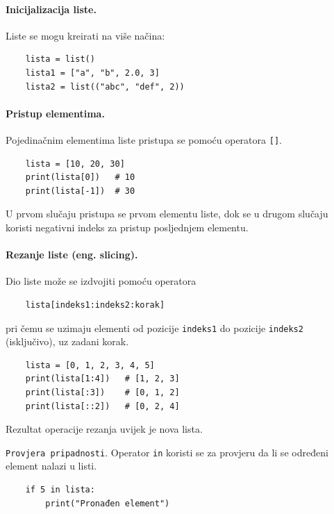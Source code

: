 \paragraph{Inicijalizacija liste.}  Liste se mogu kreirati na više načina: 

\begin{verbatim}
	lista = list()
	lista1 = ["a", "b", 2.0, 3]	
	lista2 = list(("abc", "def", 2))
\end{verbatim}

\paragraph{Pristup elementima.}  Pojedinačnim elementima liste pristupa se pomoću operatora \texttt{[]}.

\begin{verbatim}
	lista = [10, 20, 30]
	print(lista[0])   # 10
	print(lista[-1])  # 30
\end{verbatim}

U prvom slučaju pristupa se prvom elementu liste, dok se u drugom slučaju koristi negativni indeks za pristup posljednjem elementu.

\paragraph{Rezanje liste (eng. slicing).}

Dio liste može se izdvojiti pomoću operatora

\begin{verbatim}
	lista[indeks1:indeks2:korak]
\end{verbatim}

pri čemu se uzimaju elementi od pozicije \texttt{indeks1} do pozicije \texttt{indeks2} (isključivo), uz zadani korak.

\begin{verbatim}
	lista = [0, 1, 2, 3, 4, 5]
	print(lista[1:4])   # [1, 2, 3]
	print(lista[:3])    # [0, 1, 2]
	print(lista[::2])   # [0, 2, 4]
\end{verbatim}

Rezultat operacije rezanja uvijek je nova lista.

\texttt{Provjera pripadnosti}.  Operator \texttt{in} koristi se za provjeru da li se određeni element nalazi u listi.

\begin{verbatim}
	if 5 in lista:
	    print("Pronađen element")
\end{verbatim}

